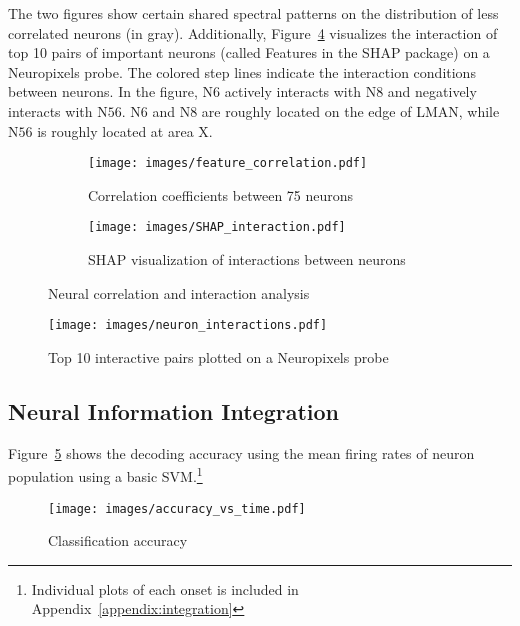 \documentclass[../CLthesis.tex]{subfiles}
\begin{document}
The two figures show certain shared spectral patterns on the distribution of less correlated neurons (in gray). Additionally, Figure~\ref{fig:neuropixel} visualizes the interaction of top 10 pairs of important neurons (called Features in the SHAP package) on a Neuropixels probe. The colored step lines indicate the interaction conditions between neurons. In the figure, N$6$ actively interacts with N$8$ and negatively interacts with N$56$. N$6$ and N$8$ are roughly located on the edge of LMAN, while N$56$ is roughly located at area X. 

\begin{figure}[H]
   \centering
   \begin{subfigure}{\textwidth}
      \centering
      \texttt{[image: images/feature\_correlation.pdf]}
      \caption{Correlation coefficients between 75 neurons}
      \label{fig:correlation}
   \end{subfigure}
   
   \begin{subfigure}{\textwidth}
      \centering
      \texttt{[image: images/SHAP\_interaction.pdf]}
      \caption{SHAP visualization of interactions between neurons}
      \label{fig:shap_interaction}
   \end{subfigure}
   \caption{Neural correlation and interaction analysis}
   \label{fig:all_neurons}
\end{figure}

\begin{figure}[H]
   \centering
   \texttt{[image: images/neuron\_interactions.pdf]}
   \caption{Top 10 interactive pairs plotted on a Neuropixels probe}
   \label{fig:neuropixel}     
\end{figure}

\newpage
\subsection{Neural Information Integration} 
Figure~\ref{fig:temporal_accuracy} shows the decoding accuracy using the mean firing rates of neuron population using a basic SVM.\footnote{Individual plots of each onset is included in Appendix~\ref{appendix:integration}} 
\begin{figure}[H]
 \centering
 \texttt{[image: images/accuracy\_vs\_time.pdf]}
 \caption{Classification accuracy}
 \label{fig:temporal_accuracy}
\end{figure}
\end{document}
